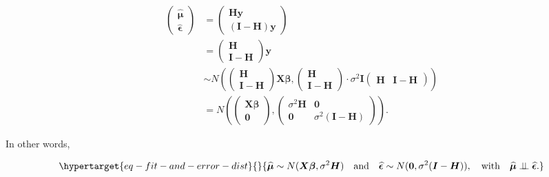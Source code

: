 \documentclass[
  11pt,
  letterpaper,
  oneside]{book}
\theoremstyle{plain}
\theoremstyle{plain}
\theoremstyle{definition}
\theoremstyle{definition}
\theoremstyle{plain}
\theoremstyle{remark}
\begin{document}
\[
\begin{split}
\begin{pmatrix} \boldsymbol{\widehat{\mu}} \\ \boldsymbol{\widehat{\epsilon}} \end{pmatrix} &= \begin{pmatrix} \boldsymbol{H} \boldsymbol{y} \\ (\boldsymbol{I} - \boldsymbol{H}) \boldsymbol{y} \end{pmatrix} \\
&= \begin{pmatrix} \boldsymbol{H} \\ \boldsymbol{I} - \boldsymbol{H} \end{pmatrix}\boldsymbol{y} \\
&\sim N\left(\begin{pmatrix} \boldsymbol{H} \\ \boldsymbol{I} - \boldsymbol{H} \end{pmatrix}\boldsymbol{X} \boldsymbol{\beta}, \begin{pmatrix} \boldsymbol{H} \\ \boldsymbol{I} - \boldsymbol{H} \end{pmatrix}\cdot \sigma^2 \boldsymbol{I} \begin{pmatrix} \boldsymbol{H} & \boldsymbol{I} - \boldsymbol{H} \end{pmatrix}\right)
\\
&= N\left(\begin{pmatrix} \boldsymbol{X} \boldsymbol{\beta} \\ \boldsymbol{0} \end{pmatrix}, \begin{pmatrix} \sigma^2 \boldsymbol{H} & \boldsymbol{0} \\ \boldsymbol{0} & \sigma^2(\boldsymbol{I} - \boldsymbol{H}) \end{pmatrix} \right).
\end{split}
\]

In other words,

\begin{equation}\protect\hypertarget{eq-fit-and-error-dist}{}{
\boldsymbol{\widehat{\mu}} \sim N(\boldsymbol{X} \boldsymbol{\beta}, \sigma^2 \boldsymbol{H}) \quad \text{and} \quad \boldsymbol{\widehat{\epsilon}} \sim N(\boldsymbol{0}, \sigma^2(\boldsymbol{I} - \boldsymbol{H})), \quad \text{with} \quad \boldsymbol{\widehat{\mu}} \perp\!\!\!\perp \boldsymbol{\widehat{\epsilon}}.
}\label{eq-fit-and-error-dist}\end{equation}
\end{document}
